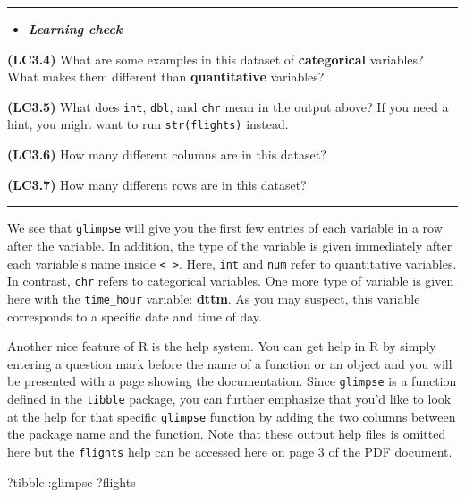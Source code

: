\documentclass[]{tufte-book}
\newenvironment{Shaded}{\begin{snugshade}}{\end{snugshade}}
\newcommand{\NormalTok}[1]{{#1}}
\let\oldrule=\rule
\renewcommand{\rule}[1]{\oldrule{\linewidth}}
\newenvironment{rmdblock}[1]
  {\begin{shaded*}
  \begin{itemize}
  \renewcommand{\labelitemi}{
    \raisebox{-.7\height}[0pt][0pt]{
    }
  }
  \item
  }
  {
  \end{itemize}
  \end{shaded*}
  }
\newenvironment{learncheck}
  {\begin{rmdblock}{warning}}
  {\end{rmdblock}}
\begin{document}
\begin{center}\rule{0.5\linewidth}{\linethickness}\end{center}

\begin{learncheck}
\textbf{\emph{Learning check}}
\end{learncheck}

\textbf{(LC3.4)} What are some examples in this dataset of
\textbf{categorical} variables? What makes them different than
\textbf{quantitative} variables?

\textbf{(LC3.5)} What does \texttt{int}, \texttt{dbl}, and \texttt{chr}
mean in the output above? If you need a hint, you might want to run
\texttt{str(flights)} instead.

\textbf{(LC3.6)} How many different columns are in this dataset?

\textbf{(LC3.7)} How many different rows are in this dataset?

\begin{center}\rule{0.5\linewidth}{\linethickness}\end{center}

We see that \texttt{glimpse} will give you the first few entries of each
variable in a row after the variable. In addition, the type of the
variable is given immediately after each variable's name inside
\texttt{\textless{}\ \textgreater{}}. Here, \texttt{int} and
\texttt{num} refer to quantitative variables. In contrast, \texttt{chr}
refers to categorical variables. One more type of variable is given here
with the \texttt{time\_hour} variable: \textbf{dttm}. As you may
suspect, this variable corresponds to a specific date and time of day.

Another nice feature of R is the help system. You can get help in R by
simply entering a question mark before the name of a function or an
object and you will be presented with a page showing the documentation.
Since \texttt{glimpse} is a function defined in the \texttt{tibble}
package, you can further emphasize that you'd like to look at the help
for that specific \texttt{glimpse} function by adding the two columns
between the package name and the function. Note that these output help
files is omitted here but the \texttt{flights} help can be accessed
\href{https://cran.r-project.org/web/packages/nycflights13/nycflights13.pdf}{here}
on page 3 of the PDF document.

\begin{Shaded}
\begin{Highlighting}[]
\NormalTok{?tibble::glimpse}
\NormalTok{?flights}
\end{Highlighting}
\end{Shaded}
\end{document}
